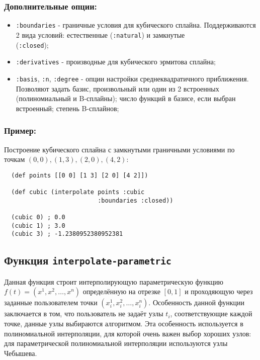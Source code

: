 \subsubsection{Дополнительные опции:}
\begin{itemize}
\item \texttt{:boundaries} - граничные условия для кубического сплайна. Поддерживаются 2 вида условий: естественные (\texttt{:natural})
                             и замкнутые \\ (\texttt{:closed});
\item \texttt{:derivatives} - производные для кубического эрмитова сплайна;
\item \texttt{:basis}, \texttt{:n}, \texttt{:degree} - опции настройки среднеквадратичного приближения. Позволяют задать базис, произвольный или один из 2 встроенных (полиномиальный и B-сплайны); число функций в базисе, если выбран встроенный; степень B-сплайнов;
\end{itemize}

\subsubsection{Пример:}

Построение кубического сплайна с замкнутыми граничными условиями по точкам $(0, 0), (1, 3), (2, 0), (4, 2)$:

\begin{verbatim}
  (def points [[0 0] [1 3] [2 0] [4 2]])

  (def cubic (interpolate points :cubic
                          :boundaries :closed))

  (cubic 0) ; 0.0
  (cubic 1) ; 3.0
  (cubic 3) ; -1.2380952380952381
\end{verbatim}

\subsection{Функция \texttt{interpolate-parametric}}

Данная функция строит интерполирующую параметрическую функцию $f(t) = (x^1, x^2, \ldots, x^n)$ определённую на отрезке $[0, 1]$ и проходяющую через заданные пользователем точки $(x_i^1, x_i^2, \ldots, x_i^n)$. Особенность данной функции заключается в том, что пользователь не задаёт узлы $t_i$, соответствующие каждой точке, данные узлы выбираются алгоритмом. Эта особенность используется в полиномиальной интерполяции, для которой очень важен выбор хороших узлов: для параметрической полиномиальной интерполяции используются узлы Чебышева.


